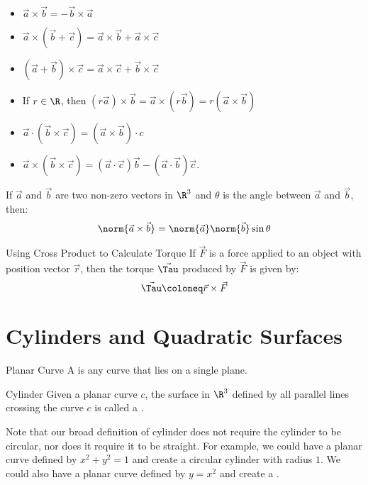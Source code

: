 \begin{itemize}
    \item $\vec{a} \times \vec{b} = -\vec{b} \times \vec{a}$
    \item $\vec{a} \times (\vec{b} + \vec{c}) = \vec{a} \times \vec{b} + \vec{a} \times \vec{c}$
    \item $(\vec{a} + \vec{b}) \times \vec{c} = \vec{a} \times \vec{c} + \vec{b} \times \vec{c}$
    \item If $r \in \R$, then $(r\vec{a}) \times \vec{b} = \vec{a} \times (r\vec{b}) = r(\vec{a} \times \vec{b})$
    \item $\vec{a} \cdot (\vec{b} \times \vec{c}) = (\vec{a} \times \vec{b}) \cdot c$
    \item $\vec{a} \times (\vec{b} \times \vec{c}) = (\vec{a} \cdot \vec{c}) \vec{b} - (\vec{a} \cdot \vec{b}) \vec{c}$.
\end{itemize}

\begin{thmbox}{}{}
    If $\vec{a}$ and $\vec{b}$ are two non-zero vectors in $\R^3$ and $\theta$ is the angle between $\vec{a}$ and $\vec{b}$, then:
    \[ \norm{\vec{a} \times \vec{b}} = \norm{\vec{a}} \norm{\vec{b}} \sin{\theta} \]
\end{thmbox}

\begin{tecbox}{Using Cross Product to Calculate Torque}{}
    If $\vec{F}$ is a force applied to an object with position vector $\vec{r}$, then the torque $\vec{\Tau}$ produced by $\vec{F}$ is given by:
    \[ \vec{\Tau} \coloneq \vec{r} \times \vec{F} \]
\end{tecbox}

\section{Cylinders and Quadratic Surfaces}

\begin{dfnbox}{Planar Curve}{}
    A  is any curve that lies on a single plane.
\end{dfnbox}

\begin{dfnbox}{Cylinder}{}
    Given a planar curve $c$, the surface in $\R^3$ defined by all parallel lines crossing the curve $c$ is called a .
\end{dfnbox}

Note that our broad definition of cylinder does not require the cylinder to be circular, nor does it require it to be straight. For example, we could have a planar curve defined by $x^2 + y^2 = 1$ and create a circular cylinder with radius $1$. We could also have a planar curve defined by $y = x^2$ and create a .

